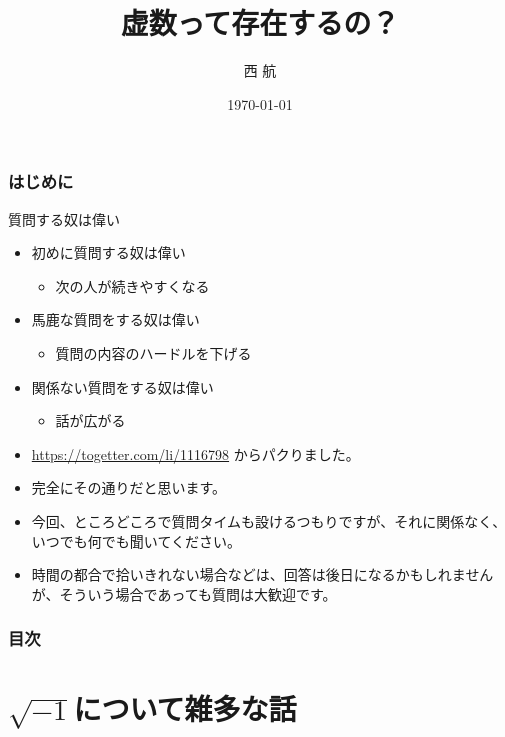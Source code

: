 \documentclass[dvipdfmx]{beamer}
\title{虚数って存在するの？}
\author{西 航}
\date{\today}
\begin{document}
  \maketitle

  \begin{frame}
    \frametitle{はじめに}
  
    \begin{alertblock}{質問する奴は偉い}
      \begin{itemize}
        \item 初めに質問する奴は偉い
        \begin{itemize}
          \item 次の人が続きやすくなる
        \end{itemize}
        \item 馬鹿な質問をする奴は偉い
        \begin{itemize}
          \item 質問の内容のハードルを下げる
        \end{itemize}
        \item 関係ない質問をする奴は偉い
        \begin{itemize}
          \item 話が広がる
        \end{itemize}
      \end{itemize}
    \end{alertblock}

    \begin{itemize}
      \item \url{https://togetter.com/li/1116798} からパクりました。
      \item 完全にその通りだと思います。
      \item 今回、ところどころで質問タイムも設けるつもりですが、それに関係なく、いつでも何でも聞いてください。
      \item 時間の都合で拾いきれない場合などは、回答は後日になるかもしれませんが、そういう場合であっても質問は大歓迎です。
    \end{itemize}
      
  \end{frame}

  \begin{frame}
    \frametitle{目次}
 
    \tableofcontents

  \end{frame}

  \section{$\sqrt{-1}$について雑多な話}
\end{document}
